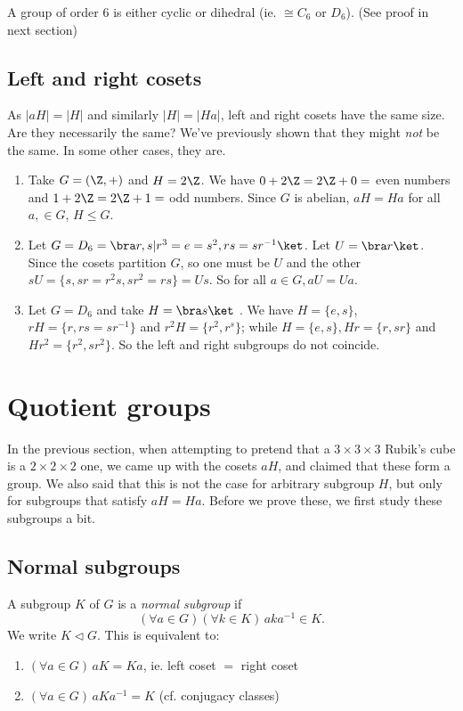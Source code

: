 \documentclass[a4paper]{article}
\begin{document}
\begin{prop}
  A group of order $6$ is either cyclic or dihedral (ie. $\cong C_6$ or $D_6$). (See proof in next section)
\end{prop}

\subsection{Left and right cosets}
As $|aH| = |H|$ and similarly $|H| = |Ha|$, left and right cosets have the same size. Are they necessarily the same? We've previously shown that they might \emph{not} be the same. In some other cases, they are.
\begin{eg}\leavevmode
  \begin{enumerate}
    \item Take $G = (\Z, +)$ and $H = 2\Z$. We have $0 + 2\Z = 2\Z + 0 = $ even numbers and $1 + 2\Z = 2\Z + 1 = $ odd numbers. Since $G$ is abelian, $aH = Ha$ for all $a, \in G$, $H\leq G$.
    \item Let $G = D_6 = \bra r, s | r^3 = e = s^2, rs = sr^{-1}\ket$. Let $U = \bra r\ket$. Since the cosets partition $G$, so one must be $U$ and the other $sU = \{s, sr = r^2s, sr^2 = rs\} = Us$. So for all $a\in G, aU = Ua$.
    \item Let $G = D_6$ and take $H = \bra s\ket$ . We have $H = \{e, s\}$, $rH = \{r, rs = sr^{-1}\}$ and $r^2 H = \{r^2, r^s\}$; while $H = \{e, s\}, Hr = \{r, sr\}$ and $Hr^2=\{r^2, sr^2\}$. So the left and right subgroups do not coincide.
  \end{enumerate}
\end{eg}

\section{Quotient groups}
In the previous section, when attempting to pretend that a $3\times 3\times 3$ Rubik's cube is a $2\times 2\times 2$ one, we came up with the cosets $aH$, and claimed that these form a group. We also said that this is not the case for arbitrary subgroup $H$, but only for subgroups that satisfy $aH = Ha$. Before we prove these, we first study these subgroups a bit.

\subsection{Normal subgroups}
\begin{defi}
  A subgroup $K$ of $G$ is a \emph{normal subgroup} if
  \[
    (\forall a\in G)(\forall k\in K)\,aka^{-1}\in K.
  \]
  We write $K\lhd G$. This is equivalent to:
  \begin{enumerate}
    \item $(\forall a\in G)\,aK = Ka$, ie. left coset $=$ right coset
    \item $(\forall a\in G)\,aKa^{-1} = K$ (cf. conjugacy classes)
  \end{enumerate}
\end{defi}
\end{document}
